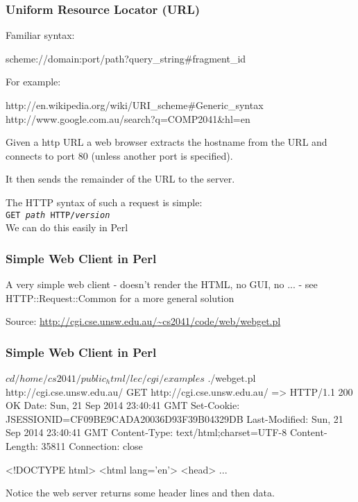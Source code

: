 \begin{frame}[fragile]
\frametitle{Uniform Resource Locator (URL)}

Familiar  syntax:

\begin{txt}
scheme://domain:port/path?query_string#fragment_id
\end{txt}

For example:

\begin{txt}
http://en.wikipedia.org/wiki/URI_scheme#Generic_syntax
http://www.google.com.au/search?q=COMP2041&hl=en
\end{txt}

Given a http URL a web browser extracts the hostname from the URL
and connects to port 80 (unless another port is specified).

It then sends the remainder of the URL to the server.

The HTTP syntax of such a request is simple: \\[2ex]

{\tt GET {\it{path}} HTTP/{\it{version}}} \\[2ex]

We can do this easily in Perl
\end{frame}

\begin{frame}[fragile]
\frametitle{Simple Web Client in Perl}
A very simple web client - doesn't render the HTML, no GUI, no ... -
see HTTP::Request::Common for a more general solution


{\tiny Source: \href{http://cgi.cse.unsw.edu.au/~cs2041/code/web/webget.pl}{http://cgi.cse.unsw.edu.au/{\textasciitilde}cs2041/code/web/webget.pl}}
\end{frame}

\begin{frame}[fragile]
\frametitle{Simple Web Client in Perl}

\begin{sh}
$ cd /home/cs2041/public_html/lec/cgi/examples
$ ./webget.pl http://cgi.cse.unsw.edu.au/
GET http://cgi.cse.unsw.edu.au/ =>
HTTP/1.1 200 OK
Date: Sun, 21 Sep 2014 23:40:41 GMT
Set-Cookie: JSESSIONID=CF09BE9CADA20036D93F39B04329DB
Last-Modified: Sun, 21 Sep 2014 23:40:41 GMT
Content-Type: text/html;charset=UTF-8
Content-Length: 35811
Connection: close

<!DOCTYPE html>
<html lang='en'>
  <head>
...
\end{sh}

Notice the web server returns some header lines and then data.
\end{frame}

